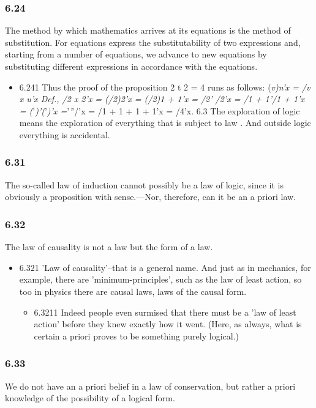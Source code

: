 \documentclass[11pt]{article}
\begin{document}
\subsubsection*{6.24}
\label{sec:org1effe23}
The method by which mathematics arrives at its equations is the method
of substitution. For equations express the substitutability of two
expressions and, starting from a number of equations, we advance to new
equations by substituting different expressions in accordance with the
equations.
\begin{itemize}
\item 6.241
\label{sec:org524fe27}
Thus the proof of the proposition 2 t 2 = 4 runs as follows: (\emph{v)n'x
= /v x u'x Def., /2 x 2'x = (/2)2'x = (/2)1 + 1'x = /2' /2'x = /1 + 1'/1 +
1'x = (}'\emph{)'(}'\emph{)'x =}'\emph{'}'/'x = /1 + 1 + 1 + 1'x = /4'x. 6.3 The
exploration of logic means the exploration of everything that is subject to
law . And outside logic everything is accidental.
\end{itemize}
\subsubsection*{6.31}
\label{sec:org4d4b0ba}
The so-called law of induction cannot possibly be a law of logic,
since it is obviously a proposition with sense.---Nor, therefore, can it be
an a priori law.
\subsubsection*{6.32}
\label{sec:orgec39d15}
The law of causality is not a law but the form of a law.
\begin{itemize}
\item 6.321
\label{sec:org9e98db4}
'Law of causality'--that is a general name. And just as in mechanics,
for example, there are 'minimum-principles', such as the law of least
action, so too in physics there are causal laws, laws of the causal form.
\begin{itemize}
\item 6.3211
\label{sec:orga3985e6}
Indeed people even surmised that there must be a 'law of least
action' before they knew exactly how it went. (Here, as always, what is
certain a priori proves to be something purely logical.)
\end{itemize}
\end{itemize}
\subsubsection*{6.33}
\label{sec:org1f32db1}
We do not have an a priori belief in a law of conservation, but rather
a priori knowledge of the possibility of a logical form.
\end{document}
